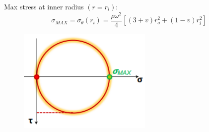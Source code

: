 \documentclass[class=report, crop=false, 12pt,a4paper]{standalone}
\begin{document}
Max stress at inner radius $\left(r = r_i\right)$:
\begin{equation}
    \sigma_{MAX} = \sigma_{\theta} \left(r_i\right) = \frac{\rho \omega^2 }{4}\left[\left(3+v\right) r_o^2 + \left(1-v\right)r_i^2\right]
\end{equation}
\begin{figure}[H]
    \centering
    \includegraphics[height = 5cm]{../img/diagram135.png}
    \caption{}
\end{figure}
\end{document}
